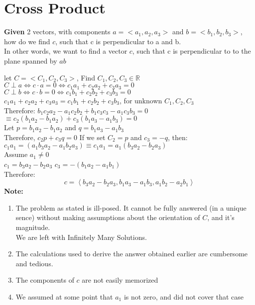\documentclass[]{article}
\title{\docTitle}
\author{\docAuthor}
\date{Thursday, February 2\textsuperscript{nd}, 2023}
\begin{document}
\maketitle
\section{Cross Product}
    \textbf{Given} 2 vectors, with components $a=<a_1, a_2, a_3>$ and $b=<b_1, b_2, b_3>$, how do we find $c$, such that c is perpendicular to a and b.\\
    In other words, we want to find a vector $c$, such that c is perpendicular to to the plane spanned by $ab$

    let $C=<C_1,C_2,C_3>$, Find $C_1,C_2,C_3 \in \mathbb{R}$\\
    $C\perp a \Leftrightarrow c\cdot a = 0 \Leftrightarrow c_1a_1 + c_2a_2 + c_3a_3 = 0$ \\
    $C\perp b \Leftrightarrow c\cdot b = 0 \Leftrightarrow c_1b_1 + c_2b_2 + c_3b_3 = 0$ \\
    $c_1a_1 + c_2a_2 + c_3a_3 = c_1b_1 + c_2b_2 + c_3b_3$, for unknown $C_1,C_2,C_3$\\
    Therefore: $b_1c_2a_2 - a_1c_2b_2 + b_1c_3c_3 - a_1c_3b_3=0$\\
    $\equiv c_2(b_1a_2-b_1a_2)+ c_3(b_1a_3-a_1b_3) = 0$\\
    Let $p = b_1a_2-b_1a_2$ and $q = b_1a_3-a_1b_3$\\
    Therefore, $c_2p+c_3q = 0$
    If we set $C_2 = p$ and $c_3 = -q$, then:\\
    $c_1a_1=(a_1b_3a_2-a_1b_2a_3) \equiv c_1a_1=a_1(b_3a_2-b_2a_3)$\\
    Assume $a_1\neq 0$\\
    $c_1=b_3a_2-b_2a_3$
    $c_3=-(b_1a_2-a_1b_1)$\\
    Therefore:
    \begin{equation*}
        c=\left\langle b_3a_2-b_2a_3, b_1a_3-a_1b_3, a_1b_2-a_2b_1\right\rangle 
    \end{equation*}
    \textbf{Note:}
    \begin{enumerate}
        \item The problem as stated is ill-posed.
            It cannot be fully answered (in a unique sence) without making assumptions about the orientation of $C$, and it's magnitude.\\ We are left with Infinitely Many Solutions.
        \item The calculations used to derive the answer obtained earlier are cumbersome and tedious.
        \item The components of $c$ are not easily memorized
        \item We assumed at some point that $a_1$ is not zero, and did not cover that case
    \end{enumerate}
\end{document}
